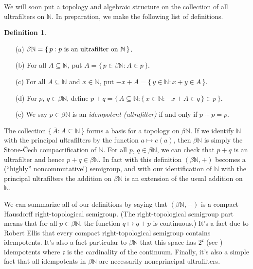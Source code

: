 \documentclass[12pt]{article}
\theoremstyle{plain}
\theoremstyle{definition}
\newtheorem{defn}[thm]{Definition}
\newcommand{\bbN}{\mathbb{N}}
\begin{document}
We will soon put a topology and algebraic structure on the collection
of all ultrafilters on $\bbN$. 
In preparation, we make the following list of definitions.

  \begin{defn}
    \label{defn:alg}
    \begin{itemize}
      \item[(a)] $\beta\bbN = \{\, p : \hbox{$p$ is an ultrafilter on
          $\bbN$} \,\}$.
      \item[(b)] For all $A \subseteq \bbN$, put $\overline{A} = \{\,
        p \in \beta\bbN : A \in p \,\}$.
      \item[(c)] For all $A \subseteq \bbN$ and $x \in \bbN$, put
        $-x+A = \{\, y \in \bbN : x+y \in A \,\}$.
      \item[(d)] For $p$, $q \in \beta\bbN$, define
        $p+q = \bigl\{\, A \subseteq \bbN : \{\, x \in \bbN : -x +A \in q
        \,\} \in p \,\bigr\}$.
      \item[(e)] We say $p \in \beta\bbN$ is an \textsl{idempotent
          (ultrafilter)} if  and only if $p + p = p$.
    \end{itemize}
  \end{defn}

The collection $\{\, \overline{A} : A \subseteq \bbN \,\}$ forms a
basis for a topology on $\beta\bbN$.
If we identify $\bbN$ with the principal ultrafilters by the function
$a \mapsto e(a)$, then $\beta\bbN$ is simply the Stone-\v{C}ech
compactification of $\bbN$. 
For all $p$, $q \in \beta\bbN$, we can check that $p+q$ is an
ultrafilter and hence $p+q \in \beta\bbN$.
In fact with this definition $(\beta\bbN, +)$ becomes a (``highly''
noncommutative!) semigroup, and with our identification of $\bbN$ with
the principal ultrafilters the addition on $\beta\bbN$ is an extension
of the usual addition on $\bbN$. 

We can summarize all of our definitions by saying that $(\beta\bbN,
+)$ is a compact Hausdorff right-topological semigroup. 
(The right-topological semigroup part means that for all $p \in
\beta\bbN$, the function $q \mapsto q+p$ is continuous.)
It's a fact due to Robert Ellis that every compact right-topological
semigroup contains idempotents. 
It's also a fact particular to $\beta\bbN$ that this space has
$2^\mathfrak{c}$ (see \cite[Theorem 6.44]{Hindman:1998fk}) idempotents
where $\mathfrak{c}$ is the cardinality of the continuum. 
Finally, it's also a simple fact that all idempotents in $\beta\bbN$
are necessarily noncprincipal ultrafilters. 
\end{document}
